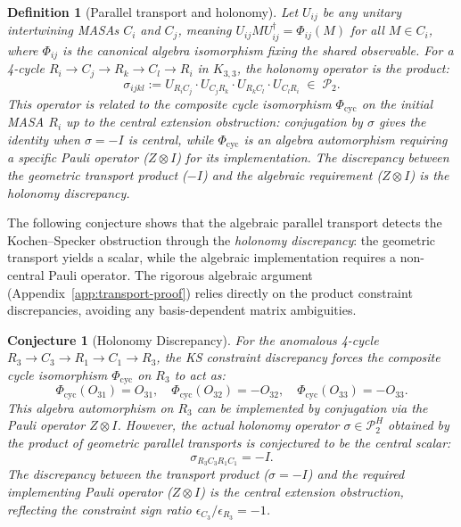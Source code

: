 \documentclass[11pt]{article}
\newtheorem{definition}[theorem]{Definition}
\newtheorem{conjecture}[theorem]{Conjecture}
\begin{document}
\begin{definition}[Parallel transport and holonomy]
\label{def:holonomy}
Let $U_{ij}$ be any unitary intertwining MASAs $C_i$ and $C_j$, meaning
$U_{ij} M U_{ij}^\dagger = \Phi_{ij}(M)$ for all $M \in C_i$, where
$\Phi_{ij}$ is the canonical algebra isomorphism fixing the shared observable.
For a 4-cycle $R_i \to C_j \to R_k \to C_l \to R_i$ in $K_{3,3}$,
the \emph{holonomy operator} is the product:
\begin{equation}
\label{eq:holonomy}
\sigma_{ijkl} := U_{R_i C_j} \cdot U_{C_j R_k} \cdot U_{R_k C_l} \cdot U_{C_l R_i}
\;\in\; \mathcal{P}_2.
\end{equation}
This operator is related to the composite cycle isomorphism $\Phi_{\mathrm{cyc}}$
on the initial MASA $R_i$ \emph{up to the central extension obstruction}:
conjugation by $\sigma$ gives the identity when $\sigma = -I$ is central,
while $\Phi_{\mathrm{cyc}}$ is an algebra automorphism requiring a specific
Pauli operator ($Z \otimes I$) for its implementation. The discrepancy
between the geometric transport product ($-I$) and the algebraic requirement
($Z \otimes I$) is the holonomy discrepancy.
\end{definition}

The following conjecture shows that the algebraic parallel transport
detects the Kochen--Specker obstruction through the \emph{holonomy discrepancy}:
the geometric transport yields a scalar, while the algebraic implementation
requires a non-central Pauli operator.
The rigorous algebraic argument (Appendix~\ref{app:transport-proof}) relies
directly on the product constraint discrepancies, avoiding any basis-dependent
matrix ambiguities.

\begin{conjecture}[Holonomy Discrepancy]
\label{thm:holonomy-statement}
For the anomalous 4-cycle $R_3 \to C_3 \to R_1 \to C_1 \to R_3$, the KS
constraint discrepancy forces the composite cycle isomorphism $\Phi_{\mathrm{cyc}}$
on $R_3$ to act as:
\[
  \Phi_{\mathrm{cyc}}(O_{31}) = O_{31}, \quad \Phi_{\mathrm{cyc}}(O_{32}) = -O_{32}, \quad \Phi_{\mathrm{cyc}}(O_{33}) = -O_{33}.
\]
This algebra automorphism on $R_3$ can be implemented by conjugation via the Pauli operator $Z \otimes I$.
However, the actual holonomy operator $\sigma \in \mathcal{P}_2^H$ obtained by the product of geometric parallel transports is conjectured to be the central scalar:
\begin{equation}
\label{eq:holonomy-statement}
\sigma_{R_3 C_3 R_1 C_1} = -I.
\end{equation}
The discrepancy between the transport product ($\sigma = -I$) and the required implementing Pauli operator ($Z \otimes I$) is the central extension obstruction, reflecting the constraint sign ratio $\epsilon_{C_3}/\epsilon_{R_3} = -1$.
\end{conjecture}
\end{document}

